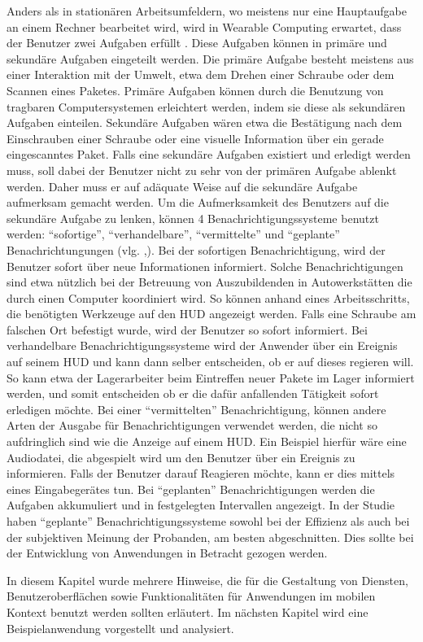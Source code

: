 Anders als in stationären Arbeitsumfeldern, wo meistens nur eine Hauptaufgabe an einem Rechner bearbeitet wird, wird in Wearable Computing erwartet, dass der Benutzer zwei Aufgaben erfüllt \cite{Witt:2006hi}. Diese Aufgaben können in primäre und sekundäre Aufgaben eingeteilt werden. Die primäre Aufgabe besteht meistens aus einer Interaktion mit der Umwelt, etwa dem Drehen einer Schraube oder dem Scannen eines Paketes. Primäre Aufgaben können durch die Benutzung von tragbaren Computersystemen erleichtert werden, indem sie diese als sekundären Aufgaben einteilen. Sekundäre Aufgaben wären etwa die Bestätigung nach dem Einschrauben einer Schraube oder eine visuelle Information über ein gerade eingescanntes Paket. Falls eine sekundäre Aufgaben existiert und erledigt werden muss, soll dabei der Benutzer nicht zu sehr von der primären Aufgabe ablenkt werden. Daher muss er auf adäquate Weise auf die sekundäre Aufgabe aufmerksam gemacht werden. Um die Aufmerksamkeit des Benutzers auf die sekundäre Aufgabe zu lenken, können 4 Benachrichtigungssysteme benutzt werden: “sofortige”, “verhandelbare”, “vermittelte” und “geplante” Benachrichtungungen (vlg. \cite{McFarlane:1999um},\cite{Nilsson:cq}). Bei der sofortigen Benachrichtigung, wird der Benutzer sofort über neue Informationen informiert. Solche Benachrichtigungen sind etwa nützlich bei der Betreuung von Auszubildenden in Autowerkstätten die durch einen Computer koordiniert wird. So können anhand eines Arbeitsschritts, die benötigten Werkzeuge auf den HUD angezeigt werden. Falls eine Schraube am falschen Ort befestigt wurde, wird  der Benutzer so sofort informiert. Bei verhandelbare Benachrichtigungssysteme wird der Anwender über ein Ereignis auf seinem HUD und kann dann selber entscheiden, ob er auf dieses regieren will. So kann etwa der Lagerarbeiter beim Eintreffen neuer Pakete im Lager informiert werden, und somit entscheiden ob er die dafür anfallenden Tätigkeit sofort erledigen möchte. Bei einer “vermittelten” Benachrichtigung, können andere Arten der Ausgabe für Benachrichtigungen verwendet werden, die nicht so aufdringlich sind wie die Anzeige auf einem HUD. Ein Beispiel hierfür wäre eine Audiodatei, die abgespielt wird um den Benutzer über ein Ereignis zu informieren. Falls der Benutzer darauf Reagieren möchte, kann er  dies mittels eines Eingabegerätes tun. Bei “geplanten” Benachrichtigungen werden die Aufgaben  akkumuliert und in festgelegten Intervallen angezeigt. In der Studie \cite{Nilsson:cq}  haben “geplante” Benachrichtigungssysteme sowohl bei der Effizienz als auch bei der subjektiven Meinung der Probanden,  am besten abgeschnitten. Dies sollte bei der Entwicklung von Anwendungen in Betracht gezogen werden.


In diesem Kapitel wurde mehrere Hinweise, die für die Gestaltung von Diensten, Benutzeroberflächen sowie Funktionalitäten für Anwendungen im mobilen Kontext benutzt werden sollten erläutert. Im nächsten Kapitel wird eine Beispielanwendung vorgestellt und analysiert.

